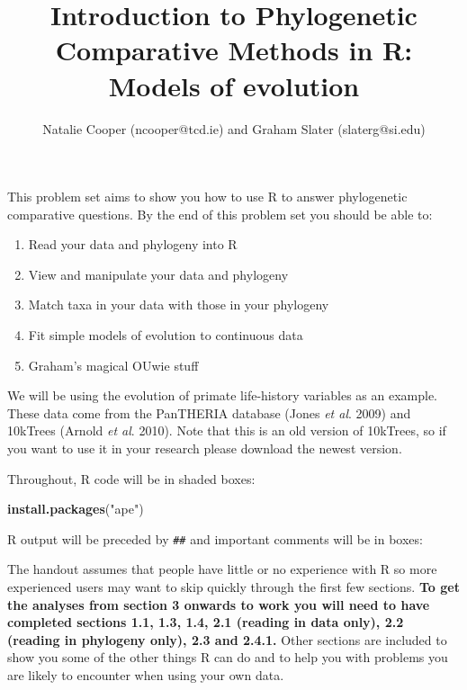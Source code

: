 \documentclass[11pt]{article}
\newcommand{\KeywordTok}[1]{\textcolor[rgb]{0.13,0.29,0.53}{\textbf{{#1}}}}
\newcommand{\StringTok}[1]{\textcolor[rgb]{0.31,0.60,0.02}{{#1}}}
\newcommand{\NormalTok}[1]{{#1}}
\begin{document}
\title{Introduction to Phylogenetic Comparative Methods in R: Models of evolution}
\author{Natalie Cooper (ncooper@tcd.ie) and Graham Slater (slaterg@si.edu)}
\date{}
\maketitle

This problem set aims to show you how to use R to answer phylogenetic 
comparative questions. By the end of this problem set you should be able to:

\begin{enumerate}
\item Read your data and phylogeny into R
\item View and manipulate your data and phylogeny
\item Match taxa in your data with those in your phylogeny
\item Fit simple models of evolution to continuous data
\item Graham's magical OUwie stuff
\end{enumerate}

We will be using the evolution of primate life-history variables as an
example. These data come from the PanTHERIA database (Jones \textit{et
al}. 2009) and 10kTrees (Arnold \textit{et al}. 2010). Note that this is
an old version of 10kTrees, so if you want to use it in your research
please download the newest version.

Throughout, R code will be in shaded boxes:

\begin{snugshade}
\begin{Highlighting}[]
\KeywordTok{install.packages}\NormalTok{(}\StringTok{"ape"}\NormalTok{)}
\end{Highlighting}
\end{snugshade}

R output will be preceded by \texttt{\#\#} and important comments will be in boxes:

\begin{framed}

The handout assumes that people have little or no experience with R so 
more experienced users may want to skip quickly through the first 
few sections. \textbf{To get the analyses from section 3 onwards to work you 
will need to have completed sections 1.1, 1.3, 1.4, 2.1 (reading in data only), 
2.2 (reading in phylogeny only), 2.3 and 2.4.1.} Other sections are included to show 
you some of the other things R can do and to help you with problems you are 
likely to encounter when using your own data. 
\end{framed}
\end{document}
